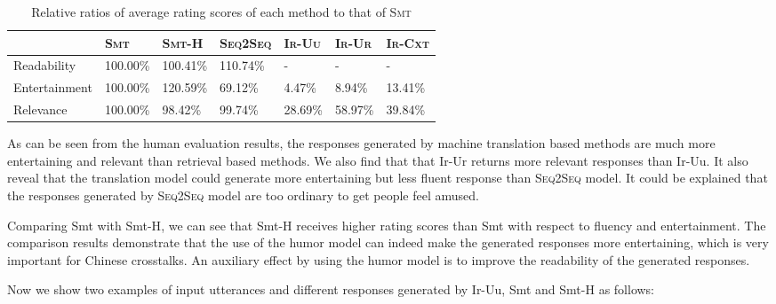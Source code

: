 \documentclass[letterpaper]{article} %
\begin{document}
\begin{CJK*}{UTF8}{gbsn}
\begin{table*}[tb]
	\centering
	\begin{tabular}{lllllll}
		\toprule
		& \textsc{Smt} & \textsc{Smt-H} & \textsc{Seq2Seq} & \textsc{Ir-Uu} & \textsc{Ir-Ur} & \textsc{Ir-Cxt} \\
		\midrule
		Readability & 100.00\% & 100.41\% & 110.74\% & - & - & - \\
		Entertainment & 100.00\% & 120.59\% & 69.12\% & 4.47\% & 8.94\% & 13.41\% \\
		Relevance & 100.00\% & 98.42\% & 99.74\% & 28.69\% & 58.97\% & 39.84\% \\
		\bottomrule
	\end{tabular}
	\caption{Relative ratios of average rating scores of each method to that of \textsc{Smt}}
	\label{res-relative}
\end{table*} 

As can be seen from the human evaluation results, the responses generated by machine translation based methods are much more entertaining and relevant than retrieval based methods. We also find that that {\sc Ir-Ur} returns more relevant responses than {\sc Ir-Uu}. 
It also reveal that the translation model could generate more entertaining but less fluent response than \textsc{Seq2Seq} model. It could be explained that the responses generated by \textsc{Seq2Seq} model are too ordinary to get people feel amused.

Comparing {\sc Smt} with {\sc Smt-H}, we can see that {\sc Smt-H} receives higher rating scores than {\sc Smt} with respect to fluency and entertainment. The comparison results demonstrate that the use of the humor model can indeed make the generated responses more entertaining, which is very important for Chinese crosstalks. An auxiliary effect by using the humor model is to improve the readability of the generated responses. 


Now we show two examples of input utterances and different responses generated by {\sc Ir-Uu}, {\sc Smt} and {\sc Smt-H} as follows:


\end{CJK*}
\end{document}
